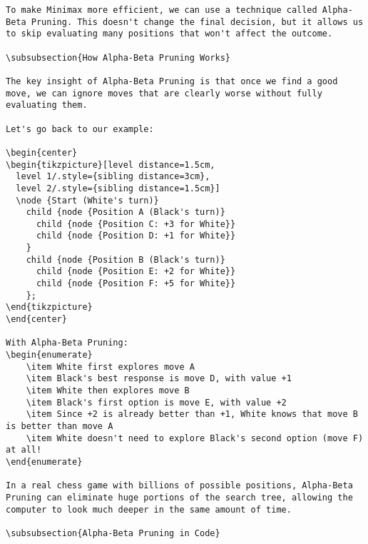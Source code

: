 \documentclass[11pt]{article}
\begin{document}
\begin{lstlisting}[style=Python]
To make Minimax more efficient, we can use a technique called Alpha-Beta Pruning. This doesn't change the final decision, but it allows us to skip evaluating many positions that won't affect the outcome.

\subsubsection{How Alpha-Beta Pruning Works}

The key insight of Alpha-Beta Pruning is that once we find a good move, we can ignore moves that are clearly worse without fully evaluating them.

Let's go back to our example:

\begin{center}
\begin{tikzpicture}[level distance=1.5cm,
  level 1/.style={sibling distance=3cm},
  level 2/.style={sibling distance=1.5cm}]
  \node {Start (White's turn)}
    child {node {Position A (Black's turn)}
      child {node {Position C: +3 for White}}
      child {node {Position D: +1 for White}}
    }
    child {node {Position B (Black's turn)}
      child {node {Position E: +2 for White}}
      child {node {Position F: +5 for White}}
    };
\end{tikzpicture}
\end{center}

With Alpha-Beta Pruning:
\begin{enumerate}
    \item White first explores move A
    \item Black's best response is move D, with value +1
    \item White then explores move B
    \item Black's first option is move E, with value +2
    \item Since +2 is already better than +1, White knows that move B is better than move A
    \item White doesn't need to explore Black's second option (move F) at all!
\end{enumerate}

In a real chess game with billions of possible positions, Alpha-Beta Pruning can eliminate huge portions of the search tree, allowing the computer to look much deeper in the same amount of time.

\subsubsection{Alpha-Beta Pruning in Code}


\end{lstlisting}
\end{document}
